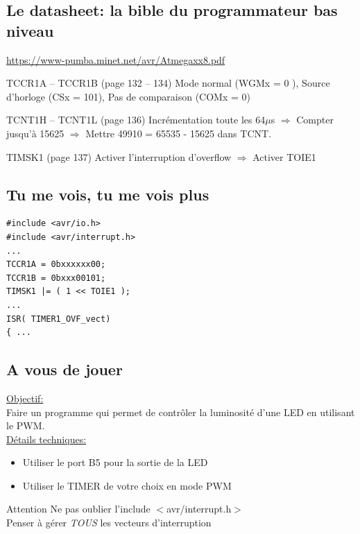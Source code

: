 \documentclass{beamer}
\begin{document}
\subsection{Le datasheet: la bible du programmateur bas niveau}

\begin{frame}
  \hyperlink{https://www-pumba.minet.net/avr/Atmegaxx8.pdf}{https://www-pumba.minet.net/avr/Atmegaxx8.pdf}
  \pause
  \begin{block}{TCCR1A -- TCCR1B (page 132 -- 134)}
    Mode normal (WGMx = 0 ), Source d'horloge (CSx = 101), Pas de comparaison (COMx = 0) 
  \end{block}
  \pause
  \begin{block}{TCNT1H -- TCNT1L (page 136) }
    Incr\'ementation toute les 64$\mu$s \pause $\Longrightarrow$ Compter jusqu'\`a 15625 \pause $\Longrightarrow$ Mettre 49910 = 65535 - 15625 dans TCNT.
  \end{block}
  \pause
  \begin{block}{TIMSK1 (page 137)}
    Activer l'interruption d'overflow \pause $\Longrightarrow$ Activer TOIE1
  \end{block}
\end{frame}

\subsection{Tu me vois, tu me vois plus}

\lstset{language=c++} 
\lstset{commentstyle=\textit} 
\begin{lstlisting}
#include <avr/io.h>
#include <avr/interrupt.h>
...
TCCR1A = 0bxxxxxx00;
TCCR1B = 0bxxx00101;
TIMSK1 |= ( 1 << TOIE1 );
...
ISR( TIMER1_OVF_vect)
{ ...
\end{lstlisting}

\subsection{A vous de jouer}

\begin{frame}
  \underline{Objectif:}\\
  Faire un programme qui permet de contr\^oler la luminosit\'e d'une LED en utilisant le PWM.\\
  \pause
  \underline{D\'etails techniques:}\\
  \begin{itemize}
    \pause
    \item Utiliser le port B5 pour la sortie de la LED
    \pause
    \item Utiliser le TIMER de votre choix en mode PWM
  \end{itemize}

  \pause
  \begin{alertblock}{Attention}
    Ne pas oublier l'include $<$avr/interrupt.h$>$\\
    Penser \`a g\'erer \emph{TOUS} les vecteurs d'interruption
  \end{alertblock}
\end{frame}
\end{document}
